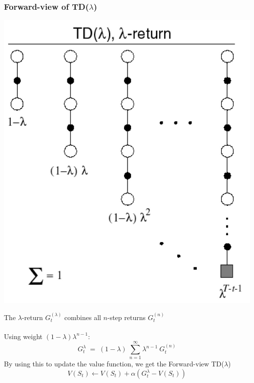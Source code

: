 \documentclass[10pt]{article}
\begin{document}
\subsubsection*{Forward-view of TD($\lambda$)}
\begin{minipage}{0.5\textwidth}
\includegraphics[width=\textwidth]{pictures/lambda_return.jpg}
\end{minipage} \hfill
\begin{minipage}{0.5\textwidth}
The $\lambda$-return $G_{t}^{(\lambda)}$ combines all $n$-step returns $G_{t}^{(n)}$  \\ \\
Using weight $(1-\lambda)\lambda^{n-1}$:
\begin{equation}
G_{t}^{\lambda}\;=\; (1-\lambda)\:\sum_{n=1}^{\infty} \lambda^{n-1} \: G_{t}^{(n)}
\label{eq:fw-lambda} \end{equation}
By using this to update the value function, we get the Forward-view TD($\lambda$)
\begin{equation}
V(S_{t}) \leftarrow V(S_{t}) + \alpha (G_{t}^{\lambda} - V(S_{t}))
\end{equation}
\end{minipage}
\end{document}
